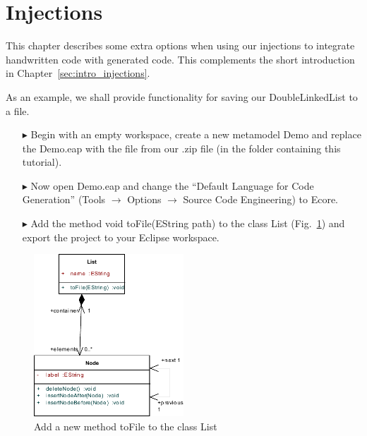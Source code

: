 \section{Injections}
\label{sec:appendix_injections}

This chapter describes some extra options when using our injections to integrate handwritten code with generated code. 
This complements the short introduction in Chapter~\ref{sec:intro_injections}.

As an example, we shall provide functionality for saving our \textsf{DoubleLinkedList} to a file.

\begin{enumerate}
  \item[$\blacktriangleright$] Begin with an empty workspace, create a new metamodel \textsf{Demo} and replace the \textsf{Demo.eap} with the file from our .zip file (in the folder containing this tutorial). 
  \item[$\blacktriangleright$] Now open \textsf{Demo.eap} and change the ``Default Language for Code Generation'' (Tools $\rightarrow$ Options $\rightarrow$ Source Code Engineering) to \textsf{Ecore}. 
  \item[$\blacktriangleright$] Add the method \textsf{void toFile(EString path)} to the class \textsf{List} (Fig.~\ref{fig:append_inj_diagram}) and export the project to your Eclipse workspace.
\end{enumerate}
\begin{figure}[htbp]
\begin{center}
  \includegraphics[width=0.5\textwidth]{pics/advancedTopics/injections/ea_diagram}
  \caption{Add a new method \textsf{toFile} to the class \textsf{List}}
  \label{fig:append_inj_diagram}
\end{center}
\end{figure}

